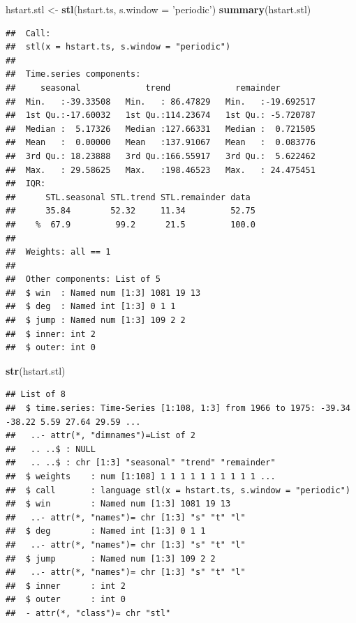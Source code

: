 \documentclass[
]{article}
\newenvironment{Shaded}{\begin{snugshade}}{\end{snugshade}}
\newcommand{\DataTypeTok}[1]{\textcolor[rgb]{0.13,0.29,0.53}{#1}}
\newcommand{\KeywordTok}[1]{\textcolor[rgb]{0.13,0.29,0.53}{\textbf{#1}}}
\newcommand{\NormalTok}[1]{#1}
\newcommand{\StringTok}[1]{\textcolor[rgb]{0.31,0.60,0.02}{#1}}
\begin{document}
\begin{Shaded}
\begin{Highlighting}[]
\NormalTok{hstart.stl <-}\StringTok{ }\KeywordTok{stl}\NormalTok{(hstart.ts, }\DataTypeTok{s.window =} \StringTok{'periodic'}\NormalTok{)}
\KeywordTok{summary}\NormalTok{(hstart.stl)}
\end{Highlighting}
\end{Shaded}

\begin{verbatim}
##  Call:
##  stl(x = hstart.ts, s.window = "periodic")
## 
##  Time.series components:
##     seasonal             trend             remainder         
##  Min.   :-39.33508   Min.   : 86.47829   Min.   :-19.692517  
##  1st Qu.:-17.60032   1st Qu.:114.23674   1st Qu.: -5.720787  
##  Median :  5.17326   Median :127.66331   Median :  0.721505  
##  Mean   :  0.00000   Mean   :137.91067   Mean   :  0.083776  
##  3rd Qu.: 18.23888   3rd Qu.:166.55917   3rd Qu.:  5.622462  
##  Max.   : 29.58625   Max.   :198.46523   Max.   : 24.475451  
##  IQR:
##      STL.seasonal STL.trend STL.remainder data 
##      35.84        52.32     11.34         52.75
##    %  67.9         99.2      21.5         100.0
## 
##  Weights: all == 1
## 
##  Other components: List of 5
##  $ win  : Named num [1:3] 1081 19 13
##  $ deg  : Named int [1:3] 0 1 1
##  $ jump : Named num [1:3] 109 2 2
##  $ inner: int 2
##  $ outer: int 0
\end{verbatim}

\begin{Shaded}
\begin{Highlighting}[]
\KeywordTok{str}\NormalTok{(hstart.stl)}
\end{Highlighting}
\end{Shaded}

\begin{verbatim}
## List of 8
##  $ time.series: Time-Series [1:108, 1:3] from 1966 to 1975: -39.34 -38.22 5.59 27.64 29.59 ...
##   ..- attr(*, "dimnames")=List of 2
##   .. ..$ : NULL
##   .. ..$ : chr [1:3] "seasonal" "trend" "remainder"
##  $ weights    : num [1:108] 1 1 1 1 1 1 1 1 1 1 ...
##  $ call       : language stl(x = hstart.ts, s.window = "periodic")
##  $ win        : Named num [1:3] 1081 19 13
##   ..- attr(*, "names")= chr [1:3] "s" "t" "l"
##  $ deg        : Named int [1:3] 0 1 1
##   ..- attr(*, "names")= chr [1:3] "s" "t" "l"
##  $ jump       : Named num [1:3] 109 2 2
##   ..- attr(*, "names")= chr [1:3] "s" "t" "l"
##  $ inner      : int 2
##  $ outer      : int 0
##  - attr(*, "class")= chr "stl"
\end{verbatim}
\end{document}
